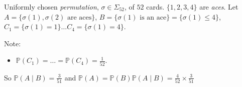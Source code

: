 \begin{example}
    Uniformly chosen \emph{permutation}, $\sigma \in \Sigma_{52}$, of $52$ cards.
    $\{1, 2, 3, 4\}$ are \emph{aces}.
    Let $A = \{\sigma(1), \sigma(2) \text{ are aces}\}$, $B = \{\sigma(1) \text{ is an ace}\} = \{\sigma(1) \leq 4\}$, $C_1 = \{\sigma(1) = 1\} \dots C_4 = \{\sigma(1) = 4\}$.

    Note:
    \begin{itemize}
        \mathitem \begin{align*}
            \mathbb{P}(A \mid C_i) &= \mathbb{P}(\sigma(2) \in \{1, 2, 3, 4\} \mid \sigma(1) = i) \quad i \leq 4 \\
            &= \frac{3}{51} \text{ by \Cref{exm:conditional}}
        \end{align*} 
        \item $\mathbb{P}(C_1) = \dots = \mathbb{P}(C_4) = \frac{1}{52}$.
    \end{itemize} 
    So $\mathbb{P}(A \mid B) = \frac{3}{51}$ and $\mathbb{P}(A) = \mathbb{P}(B) \mathbb{P}(A \mid B) = \frac{4}{52} \times \frac{3}{51}$
\end{example}
